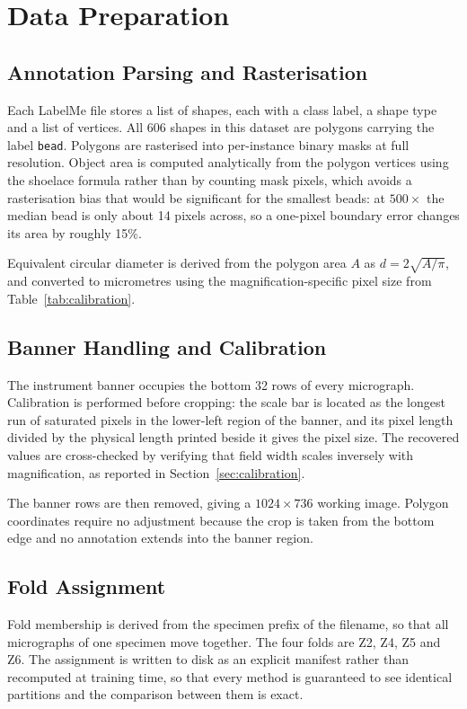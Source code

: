 \section{Data Preparation}

\subsection{Annotation Parsing and Rasterisation}

Each LabelMe file stores a list of shapes, each with a class label, a shape type and
a list of vertices. All 606 shapes in this dataset are polygons carrying the label
\texttt{bead}. Polygons are rasterised into per-instance binary masks at full
resolution. Object area is computed analytically from the polygon vertices using the
shoelace formula rather than by counting mask pixels, which avoids a rasterisation
bias that would be significant for the smallest beads: at $500\times$ the median bead
is only about 14 pixels across, so a one-pixel boundary error changes its area by
roughly 15\%.

Equivalent circular diameter is derived from the polygon area $A$ as
$d = 2\sqrt{A/\pi}$, and converted to micrometres using the magnification-specific
pixel size from Table~\ref{tab:calibration}.

\subsection{Banner Handling and Calibration}

The instrument banner occupies the bottom 32 rows of every micrograph. Calibration
is performed before cropping: the scale bar is located as the longest run of
saturated pixels in the lower-left region of the banner, and its pixel length divided
by the physical length printed beside it gives the pixel size. The recovered values
are cross-checked by verifying that field width scales inversely with magnification,
as reported in Section~\ref{sec:calibration}.

The banner rows are then removed, giving a $1024 \times 736$ working image. Polygon
coordinates require no adjustment because the crop is taken from the bottom edge and
no annotation extends into the banner region.

\subsection{Fold Assignment}

Fold membership is derived from the specimen prefix of the filename, so that all
micrographs of one specimen move together. The four folds are Z2, Z4, Z5 and Z6. The
assignment is written to disk as an explicit manifest rather than recomputed at
training time, so that every method is guaranteed to see identical partitions and the
comparison between them is exact.


